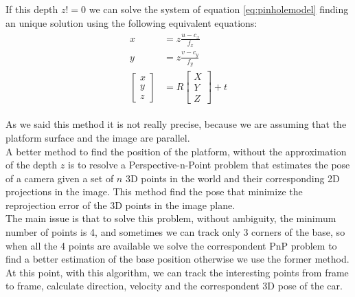 If this depth $z!=0$ we can  solve the system of equation \ref{eq:pinholemodel} finding an unique solution using the following equivalent equations:
\begin{align}
\begin{split}
x &= z\frac{u-c_x}{f_x}\\[10pt]
y &= z\frac{v-c_y}{f_y}\\[10pt]
{\begin{bmatrix}
x \\[10pt]
y \\[10pt]
z
\end{bmatrix}} &= 
R {\begin{bmatrix}
X \\[10pt]
Y \\[10pt]
Z
\end{bmatrix}} + t
\end{split}
\end{align}

As we said this method it is not really precise, because we are assuming that the platform surface and the image are parallel.\\
A better method to find the position of the platform, without the approximation of the depth $z$ is to resolve a Perspective-n-Point problem  \cite{quan1999linear} that estimates the pose of a camera given a set of $n$ 3D points in the world and their corresponding 2D projections in the image. This method find the pose that minimize the reprojection error of the 3D points in the image plane.\\
The main issue is that to solve this problem, without ambiguity, the minimum number of points is 4, and sometimes we can track only 3 corners of the base, so when all the 4 points are available we solve the correspondent PnP problem to find a better estimation of the base position otherwise we use the former method.\\

At this point, with this algorithm, we can track the interesting points from frame to frame, calculate direction, velocity and the correspondent 3D pose of the car.\\

